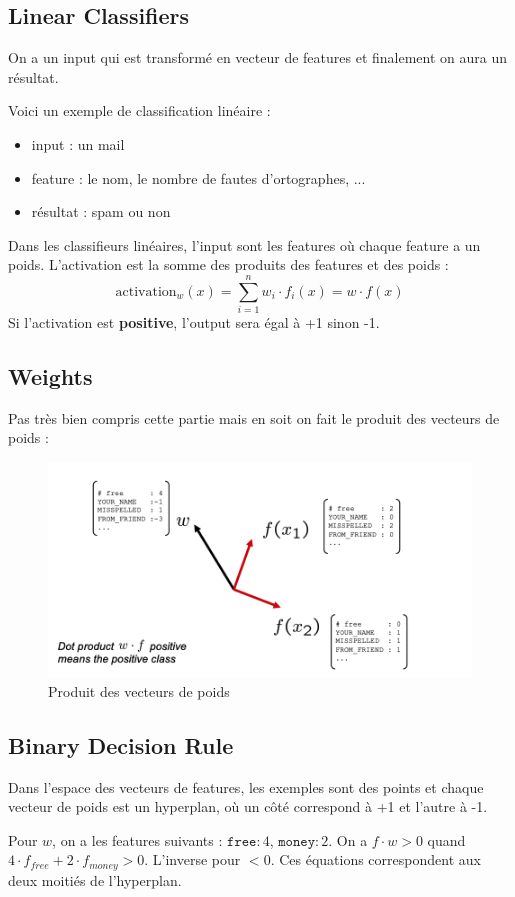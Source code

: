 \subsection{Linear Classifiers}
\label{sub:linear_classifiers}
On a un input qui est transformé en vecteur de features et finalement on aura un résultat.
\begin{example}
    Voici un exemple de classification linéaire :
    \begin{itemize}[label=\textbullet]
        \item input : un mail
        \item feature : le nom, le nombre de fautes d'ortographes, ...
        \item résultat : spam ou non
    \end{itemize}
\end{example}

Dans les classifieurs linéaires, l'input sont les features où chaque feature a un poids. L'activation est la somme des produits
des features et des poids :
\begin{equation*}
    \text{activation}_w(x) = \sum_{i=1}^{n} w_i\cdot f_i(x) = w\cdot f(x)
\end{equation*}
Si l'activation est \textbf{positive}, l'output sera égal à +1 sinon -1. 

\subsection{Weights}
\label{sub:weights}
Pas très bien compris cette partie mais en soit on fait le produit des vecteurs de poids :
\begin{figure}[H]
    \centering
    \includegraphics[scale=0.6]{pictures/weights_product.png}
    \caption{Produit des vecteurs de poids}
\end{figure}


\subsection{Binary Decision Rule}
\label{sub:binary_decision_rule}
Dans l'espace des vecteurs de features, les exemples sont des points et chaque vecteur de poids est un hyperplan, où un côté
correspond à +1 et l'autre à -1.
\begin{example}
    Pour $w$, on a les features suivants : $\texttt{free} : 4$, $\texttt{money} : 2$. On a $f \cdot w > 0$ quand $4\cdot f_{free} + 2\cdot f_{money} > 0$.
    L'inverse pour $<0$. Ces équations correspondent aux deux moitiés de l'hyperplan.
\end{example}

